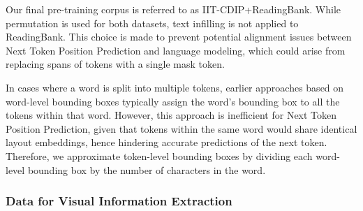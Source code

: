 Our final pre-training corpus is referred to as IIT-CDIP+ReadingBank. While permutation is used for both datasets, text infilling is not applied to ReadingBank. This choice is made to prevent potential alignment issues between Next Token Position Prediction and language modeling, which could arise from replacing spans of tokens with a single mask token.

In cases where a word is split into multiple tokens, earlier approaches based on word-level bounding boxes typically assign the word's bounding box to all the tokens within that word. However, this approach is inefficient for Next Token Position Prediction, given that tokens within the same word would share identical layout embeddings, hence hindering accurate predictions of the next token. Therefore, we approximate token-level bounding boxes by dividing each word-level bounding box by the number of characters in the word. 

\subsubsection{Data for Visual Information Extraction}

